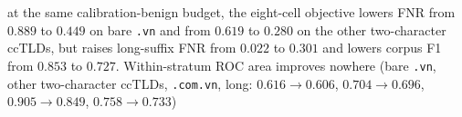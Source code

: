 at the same calibration-benign budget, the eight-cell objective lowers FNR from $0.889$ to $0.449$ on bare \texttt{.vn} and from $0.619$ to $0.280$ on the other two-character ccTLDs, but raises long-suffix FNR from $0.022$ to $0.301$ and lowers corpus F1 from $0.853$ to $0.727$. Within-stratum ROC area improves nowhere (bare \texttt{.vn}, other two-character ccTLDs, \texttt{.com.vn}, long: $0.616 \to 0.606$, $0.704 \to 0.696$, $0.905 \to 0.849$, $0.758 \to 0.733$)%
